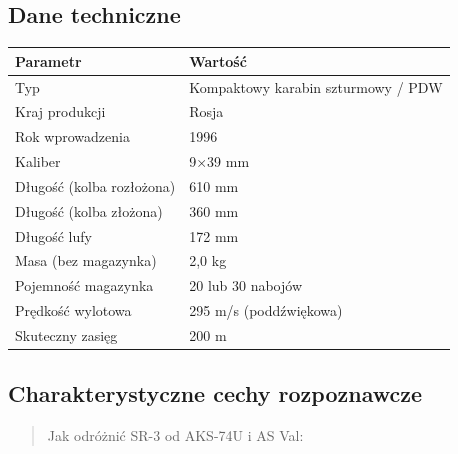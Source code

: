 \documentclass[12pt,oneside]{book}
\begin{document}
\subsection{Dane techniczne}\label{dane-techniczne-67}

\begin{longtable}[]{@{}ll@{}}
\toprule\noalign{}
Parametr & Wartość \\
\midrule\noalign{}
\endhead
\bottomrule\noalign{}
\endlastfoot
Typ & Kompaktowy karabin szturmowy / PDW \\
Kraj produkcji & Rosja \\
Rok wprowadzenia & 1996 \\
Kaliber & 9×39 mm \\
Długość (kolba rozłożona) & 610 mm \\
Długość (kolba złożona) & 360 mm \\
Długość lufy & 172 mm \\
Masa (bez magazynka) & 2,0 kg \\
Pojemność magazynka & 20 lub 30 nabojów \\
Prędkość wylotowa & 295 m/s (poddźwiękowa) \\
Skuteczny zasięg & 200 m \\
\end{longtable}

\subsection{Charakterystyczne cechy
rozpoznawcze}\label{charakterystyczne-cechy-rozpoznawcze-67}

\begin{quote}
Jak odróżnić SR-3 od AKS-74U i AS Val:
\end{quote}
\end{document}
